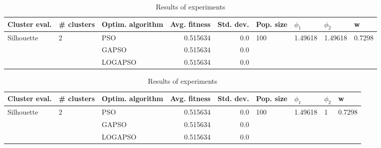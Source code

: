 \documentclass{article}
\begin{document}
\begin{table}
\centering
\caption{Results of experiments}
\begin{tabular}{lllrrllll}
\toprule
              Cluster eval. &        \# clusters & Optim. algorithm &  Avg. fitness &  Std. dev. &            Pop. size &               $\phi_{1}$ &               $\phi_{2}$ &                       w \\
\midrule
\multirow{3}{*}{Silhouette} & \multirow{3}{*}{2} &              PSO &      0.515634 &        0.0 & \multirow{3}{*}{100} & \multirow{3}{*}{1.49618} & \multirow{3}{*}{1.49618} & \multirow{3}{*}{0.7298} \\
                            &                    &            GAPSO &      0.515634 &        0.0 &                      &                          &                          &                         \\
                            &                    &          LOGAPSO &      0.515634 &        0.0 &                      &                          &                          &                         \\
\bottomrule
\end{tabular}
\end{table}
\begin{table}
\centering
\caption{Results of experiments}
\begin{tabular}{lllrrllll}
\toprule
              Cluster eval. &        \# clusters & Optim. algorithm &  Avg. fitness &  Std. dev. &            Pop. size &               $\phi_{1}$ &         $\phi_{2}$ &                       w \\
\midrule
\multirow{3}{*}{Silhouette} & \multirow{3}{*}{2} &              PSO &      0.515634 &        0.0 & \multirow{3}{*}{100} & \multirow{3}{*}{1.49618} & \multirow{3}{*}{1} & \multirow{3}{*}{0.7298} \\
                            &                    &            GAPSO &      0.515634 &        0.0 &                      &                          &                    &                         \\
                            &                    &          LOGAPSO &      0.515634 &        0.0 &                      &                          &                    &                         \\
\bottomrule
\end{tabular}
\end{table}
\end{document}
